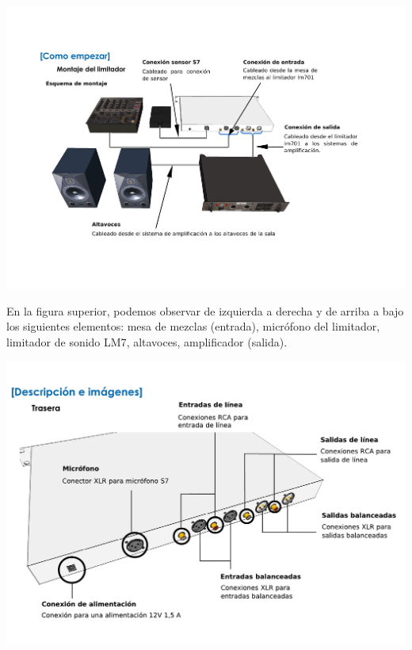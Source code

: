 \begin{center}
    \includegraphics[scale=0.6]{figuras/manual7_montaje_trim.pdf}
    \label{fig:lm7_montaje}
\end{center}

En la figura superior, podemos observar de izquierda a derecha y de arriba a bajo los siguientes elementos: mesa de mezclas (entrada), micrófono del limitador, limitador de sonido \acrshort{LM7}, altavoces, amplificador (salida).

\begin{center}
    \includegraphics[scale=0.55]{figuras/manual7_trasera_trim.pdf}
    \label{fig:lm7_trasera}
\end{center}

